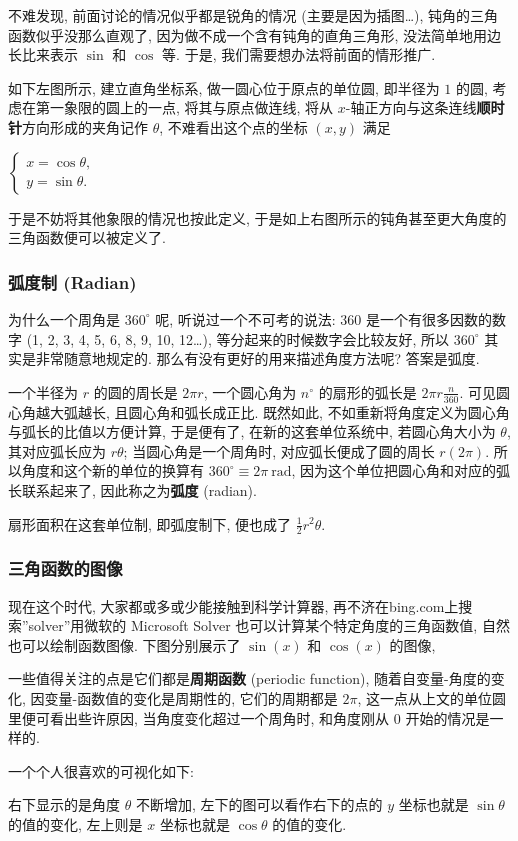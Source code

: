不难发现, 前面讨论的情况似乎都是锐角的情况 (主要是因为插图\ldots),
钝角的三角函数似乎没那么直观了, 因为做不成一个含有钝角的直角三角形,
没法简单地用边长比来表示 \(\sin\) 和 \(\cos\) 等. 于是,
我们需要想办法将前面的情形推广.

如下左图所示, 建立直角坐标系, 做一圆心位于原点的单位圆, 即半径为 \(1\)
的圆, 考虑在第一象限的圆上的一点, 将其与原点做连线, 将从
\(x\)-轴正方向与这条连线\textbf{顺时针}方向形成的夹角记作 \(\theta\),
不难看出这个点的坐标 \((x,y)\) 满足

\(\begin{cases}x=\cos\theta,\\y=\sin\theta.\end{cases}\)

于是不妨将其他象限的情况也按此定义,
于是如上右图所示的钝角甚至更大角度的三角函数便可以被定义了.

\hypertarget{ux5f27ux5ea6ux5236-radian}{%
\subsubsection{弧度制 (Radian)}\label{ux5f27ux5ea6ux5236-radian}}

为什么一个周角是 \(360^\circ\) 呢, 听说过一个不可考的说法: \(360\)
是一个有很多因数的数字 (1, 2, 3, 4, 5, 6, 8, 9, 10, 12\ldots),
等分起来的时候数字会比较友好, 所以 \(360^\circ\) 其实是非常随意地规定的.
那么有没有更好的用来描述角度方法呢? 答案是弧度.

一个半径为 \(r\) 的圆的周长是 \(2\pi r\), 一个圆心角为 \(n^\circ\)
的扇形的弧长是 \(2\pi r\frac{n}{360}\). 可见圆心角越大弧越长,
且圆心角和弧长成正比. 既然如此,
不如重新将角度定义为圆心角与弧长的比值以方便计算, 于是便有了,
在新的这套单位系统中, 若圆心角大小为 \(\theta\), 其对应弧长应为
\(r\theta\); 当圆心角是一个周角时, 对应弧长便成了圆的周长 \(r(2\pi)\).
所以角度和这个新的单位的换算有 \(360^\circ\equiv 2\pi\ \text{rad}\),
因为这个单位把圆心角和对应的弧长联系起来了, 因此称之为\textbf{弧度}
(radian).

扇形面积在这套单位制, 即弧度制下, 便也成了 \(\frac{1}{2}r^2\theta\).

\hypertarget{ux4e09ux89d2ux51fdux6570ux7684ux56feux50cf}{%
\subsubsection{三角函数的图像}\label{ux4e09ux89d2ux51fdux6570ux7684ux56feux50cf}}

现在这个时代, 大家都或多或少能接触到科学计算器,
再不济在bing.com上搜索''solver''用微软的 Microsoft Solver
也可以计算某个特定角度的三角函数值, 自然也可以绘制函数图像.
下图分别展示了 \(\sin(x)\) 和 \(\cos(x)\) 的图像,

一些值得关注的点是它们都是\textbf{周期函数} (periodic function),
随着自变量-角度的变化, 因变量-函数值的变化是周期性的, 它们的周期都是
\(2\pi\), 这一点从上文的单位圆里便可看出些许原因,
当角度变化超过一个周角时, 和角度刚从 \(0\) 开始的情况是一样的.

一个个人很喜欢的可视化如下:

右下显示的是角度 \(\theta\) 不断增加, 左下的图可以看作右下的点的 \(y\)
坐标也就是 \(\sin\theta\) 的值的变化, 左上则是 \(x\) 坐标也就是
\(\cos\theta\) 的值的变化.
